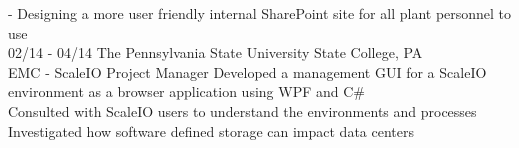 \documentclass[]{friggeri-cv}
\begin{document}
\begin{entrylist}
{    - Designing a more user friendly internal SharePoint site for all plant personnel to use\\}
  \entry
    {02/14 - 04/14}
    {The Pennsylvania State University \hfill \hfill State College, PA}
    {\\EMC - ScaleIO Project Manager}
    {Developed a management GUI for a ScaleIO environment as a browser application using WPF and C#\\
    Consulted with ScaleIO users to understand the environments and processes\\
    Investigated how software defined storage can impact data centers}

\end{entrylist}
\end{document}

